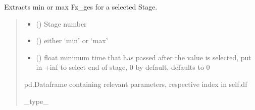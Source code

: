 \documentclass[letterpaper,10pt,english]{sphinxmanual}
\begin{document}
\begin{fulllineitems}
\begin{fulllineitems}
\label{\detokenize{tscw_module:tscw_module.tscw_DataClassesOutput.TSCW_TBHC.extract_max_force}}
\pysigstartsignatures
{}
\pysigstopsignatures
\sphinxAtStartPar
Extracts min or max Fz\_ges for a selected Stage.
\begin{quote}\begin{description}
\begin{itemize}
\item {} 
\sphinxAtStartPar
{} () \textendash{} Stage number

\item {} 
\sphinxAtStartPar
{} () \textendash{} either ‘min’ or ‘max’

\item {} 
\sphinxAtStartPar
{} (\sphinxstyleliteralemphasis{\sphinxupquote{, }}) \textendash{} float \sphinxhyphen{} minimum time that has passed after the value is selected, put in +inf to select end of stage, 0 by default, defaults to 0

\end{itemize}

\sphinxAtStartPar
pd.Dataframe containing relevant parameters, respective index in self.df

\sphinxAtStartPar
\_type\_

\end{description}\end{quote}

\end{fulllineitems}



\end{fulllineitems}
\end{document}
